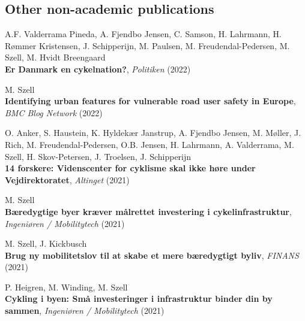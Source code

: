 \documentclass[10pt,a4paper]{article}
\renewenvironment{itemize}{
  \begin{list}{}{
    \setlength{\leftmargin}{1.5em}
    \setlength{\itemsep}{0.25em}
    \setlength{\parskip}{0pt}
    \setlength{\parsep}{0.25em}
  }
}{
  \end{list}
}
\begin{document}
\subsection*{Other non-academic publications}
\begin{itemize}
\setlength\itemsep{1em}
\item A.F. Valderrama Pineda, A. Fjendbo Jensen, C. Samson, H. Lahrmann, H. Rømmer Kristensen, J. Schipperijn, M. Paulsen, M. Freudendal-Pedersen, M. Szell, M. Hvidt Breengaard\\
\textbf{Er Danmark en cykelnation?}, \textit{Politiken} (2022)
\item M. Szell\\
    \textbf{Identifying urban features for vulnerable road user safety in Europe}, \textit{BMC Blog Network} (2022)
\item O. Anker, S. Haustein, K. Hyldekær Janstrup, A. Fjendbo Jensen, M. Møller, J. Rich, M. Freudendal-Pedersen, O.B. Jensen, H. Lahrmann, A. Valderrama, M. Szell, H. Skov-Petersen, J. Troelsen, J. Schipperijn\\
\textbf{14 forskere: Videnscenter for cyklisme skal ikke høre under Vejdirektoratet}, \textit{Altinget} (2021)
\item M. Szell\\
    \textbf{Bæredygtige byer kræver målrettet investering i cykelinfrastruktur}, \textit{Ingeniøren / Mobilitytech} (2021)
\item M. Szell, J. Kickbusch\\
    \textbf{Brug ny mobilitetslov til at skabe et mere bæredygtigt byliv}, \textit{FINANS} (2021)
\item P. Heigren, M. Winding, M. Szell\\
    \textbf{Cykling i byen: Små investeringer i infrastruktur binder din by sammen}, \textit{Ingeniøren / Mobilitytech} (2021)
\end{itemize}
\end{document}
